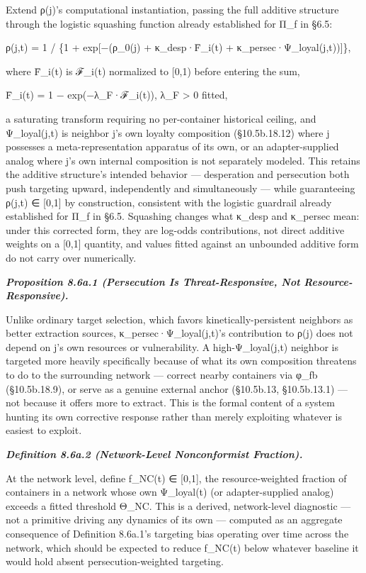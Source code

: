 \documentclass[
]{article}
\begin{document}
Extend ρ(j)'s computational instantiation, passing the full additive
structure through the logistic squashing function already established
for Π\_f in §6.5:

ρ(j,t) = 1 / \{1 + exp{[}−(ρ\_0(j) + κ\_desp·F̄\_i(t) +
κ\_persec·Ψ\_loyal(j,t)){]}\},

where F̄\_i(t) is ℱ\_i(t) normalized to {[}0,1) before entering the sum,

F̄\_i(t) = 1 − exp(−λ\_F·ℱ\_i(t)), λ\_F \textgreater{} 0 fitted,

a saturating transform requiring no per-container historical ceiling,
and Ψ\_loyal(j,t) is neighbor j's own loyalty composition (§10.5b.18.12)
where j possesses a meta-representation apparatus of its own, or an
adapter-supplied analog where j's own internal composition is not
separately modeled. This retains the additive structure's intended
behavior --- desperation and persecution both push targeting upward,
independently and simultaneously --- while guaranteeing ρ(j,t) ∈
{[}0,1{]} by construction, consistent with the logistic guardrail
already established for Π\_f in §6.5. Squashing changes what κ\_desp and
κ\_persec mean: under this corrected form, they are log-odds
contributions, not direct additive weights on a {[}0,1{]} quantity, and
values fitted against an unbounded additive form do not carry over
numerically.

\emph{\textbf{Proposition 8.6a.1 (Persecution Is Threat-Responsive, Not
Resource-Responsive).}}

Unlike ordinary target selection, which favors kinetically-persistent
neighbors as better extraction sources, κ\_persec·Ψ\_loyal(j,t)'s
contribution to ρ(j) does not depend on j's own resources or
vulnerability. A high-Ψ\_loyal(j,t) neighbor is targeted more heavily
specifically because of what its own composition threatens to do to the
surrounding network --- correct nearby containers via φ\_fb
(§10.5b.18.9), or serve as a genuine external anchor (§10.5b.13,
§10.5b.13.1) --- not because it offers more to extract. This is the
formal content of a system hunting its own corrective response rather
than merely exploiting whatever is easiest to exploit.

\emph{\textbf{Definition 8.6a.2 (Network-Level Nonconformist
Fraction).}}

At the network level, define f\_NC(t) ∈ {[}0,1{]}, the resource-weighted
fraction of containers in a network whose own Ψ\_loyal(t) (or
adapter-supplied analog) exceeds a fitted threshold Θ\_NC. This is a
derived, network-level diagnostic --- not a primitive driving any
dynamics of its own --- computed as an aggregate consequence of
Definition 8.6a.1's targeting bias operating over time across the
network, which should be expected to reduce f\_NC(t) below whatever
baseline it would hold absent persecution-weighted targeting.
\end{document}
